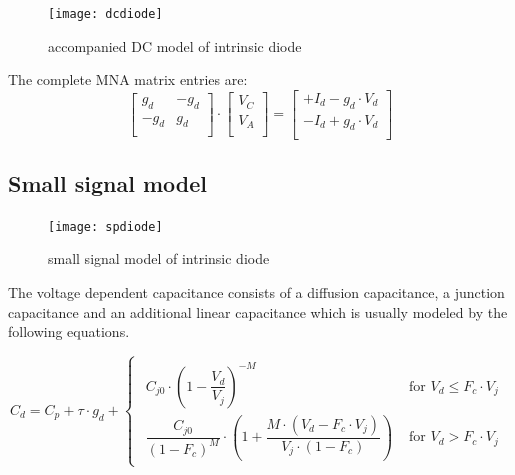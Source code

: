 \documentclass[10pt]{report}
\begin{document}
\begin{figure}[ht]
\begin{center}
\texttt{[image: dcdiode]}
\end{center}
\caption{accompanied DC model of intrinsic diode}
\label{fig:dcdiode}
\end{figure}
\FloatBarrier

The complete MNA matrix entries are:
\begin{equation}
\begin{bmatrix}
g_{d} & -g_{d}\\
-g_{d} & g_{d}\\
\end{bmatrix}
\cdot
\begin{bmatrix}
V_{C}\\
V_{A}\\
\end{bmatrix}
=
\begin{bmatrix}
+I_{d} - g_{d}\cdot V_{d}\\
-I_{d} + g_{d}\cdot V_{d}\\
\end{bmatrix}
\end{equation}

\subsection{Small signal model}

\begin{figure}[ht]
\begin{center}
\texttt{[image: spdiode]}
\end{center}
\caption{small signal model of intrinsic diode}
\label{fig:spdiode}
\end{figure}
\FloatBarrier

The voltage dependent capacitance consists of a diffusion capacitance,
a junction capacitance and an additional linear capacitance which is
usually modeled by the following equations.

\begin{equation}
C_{d} = C_p + \tau \cdot g_{d} +
\begin{cases}
\begin{array}{ll}
C_{j0}\cdot \left(1 - \dfrac{V_{d}}{V_{j}}\right)^{-M} & \textrm{ for } V_{d} \le F_c\cdot V_j\\
\dfrac{C_{j0}}{\left(1 - F_c\right)^M}\cdot \left(1 + \dfrac{M\cdot \left(V_{d} - F_c\cdot V_j\right)}{V_{j}\cdot\left(1 - F_c\right)}\right) & \textrm{ for } V_{d} > F_c\cdot V_j
\end{array}
\end{cases}
\end{equation}
\end{document}

